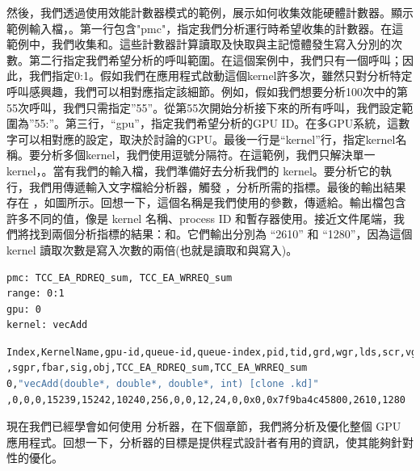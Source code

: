 然後，我們透過使用效能計數器模式的範例，展示如何收集效能硬體計數器。顯示範例輸入檔，。第一行包含"pmc"，指定我們分析運行時希望收集的計數器。在這範例中，我們收集和。這些計數器計算讀取及快取與主記憶體發生寫入分別的次數。第二行指定我們希望分析的呼叫範圍。在這個案例中，我們只有一個呼叫；因此，我們指定0:1。假如我們在應用程式啟動這個kernel許多次，雖然只對分析特定呼叫感興趣，我們可以相對應指定該細節。例如，假如我們想要分析100次中的第55次呼叫，我們只需指定”55”。從第55次開始分析接下來的所有呼叫，我們設定範圍為”55:”。第三行，“gpu”，指定我們希望分析的GPU ID。在多GPU系統，這數字可以相對應的設定，取決於討論的GPU。最後一行是“kernel”行，指定kernel名稱。要分析多個kernel，我們使用逗號分隔符。在這範例，我們只解決單一kernel，。當有我們的輸入檔，我們準備好去分析我們的 kernel。要分析它的執行，我們用傳遞輸入文字檔給分析器，觸發 ，分析所需的指標。最後的輸出結果存在 ，如圖所示。回想一下，這個名稱是我們使用的參數，傳遞給。輸出檔包含許多不同的值，像是 kernel 名稱、process ID 和暫存器使用。接近文件尾端，我們將找到兩個分析指標的結果：和。它們輸出分別為 “2610” 和 “1280”，因為這個 kernel 讀取次數是寫入次數的兩倍(也就是讀取和與寫入)。

\begin{lstlisting}[language=bash, caption={vectorAddkernel的\term{rocProf}輸入檔}, label={lst:rocProf input file}]
pmc: TCC_EA_RDREQ_sum, TCC_EA_WRREQ_sum
range: 0:1
gpu: 0
kernel: vecAdd
\end{lstlisting}

\begin{lstlisting}[language=bash, caption={vectorAddkernel的\term{rocProf}輸出檔}, label={lst:rocProf output file for the vectorAdd kernel}]
Index,KernelName,gpu-id,queue-id,queue-index,pid,tid,grd,wgr,lds,scr,vgpr
,sgpr,fbar,sig,obj,TCC_EA_RDREQ_sum,TCC_EA_WRREQ_sum
0,"vecAdd(double*, double*, double*, int) [clone .kd]"
,0,0,0,15239,15242,10240,256,0,0,12,24,0,0x0,0x7f9ba4c45800,2610,1280
\end{lstlisting}

現在我們已經學會如何使用  分析器，在下個章節，我們將分析及優化整個 GPU 應用程式。回想一下，分析器的目標是提供程式設計者有用的資訊，使其能夠針對性的優化。

